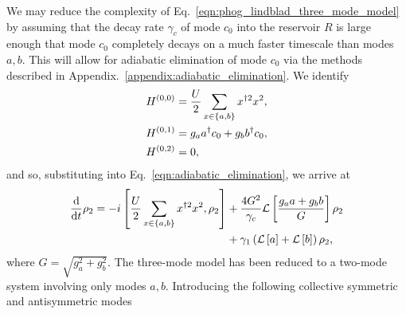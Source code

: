 We may reduce the complexity of Eq.~\ref{eqn:phog_lindblad_three_mode_model} by assuming that the decay rate $\gamma_c$ of mode $c_0$ into the reservoir $R$ is large enough that mode $c_0$ completely decays on a much faster timescale than modes $a, b$. This will allow for adiabatic elimination of mode $c_0$ via the methods described in Appendix.~\ref{appendix:adiabatic_elimination}. We identify
\begin{align}
&H^{\left(0, 0\right)} = \frac{U}{2} \sum_{x \in \left\{a, b\right\}} x^{\dagger 2} x^2, \notag \\
%
&H^{\left(0, 1\right)} = g_a a^\dagger c_0 + g_b b^\dagger c_0, \notag \\
%
&H^{\left(0, 2\right)} = 0,
\end{align}
and so, substituting into Eq.~\ref{eqn:adiabatic_elimination}, we arrive at
\begin{align}\label{eqn:phog_two_mode_model_deriv}
\frac{\mathrm{d}}{\mathrm{d}t} \rho_2 = - i \left[\frac{U}{2} \sum_{x \in \left\{a, b\right\}} x^{\dagger 2} x^2, \rho_2\right] &+ \frac{4 G^2}{\gamma_c} \mathcal{L}\left[\frac{g_a a + g_b b}{G} \right]\rho_2 \notag \\
&+ \gamma_1 \left(\mathcal{L}\left[a\right] + \mathcal{L}\left[b\right]\right)\rho_2,
\end{align}
where $G = \sqrt{g_a^2 + g_b^2}$. The three-mode model has been reduced to a two-mode system involving only modes $a, b$. Introducing the following collective symmetric and antisymmetric modes

